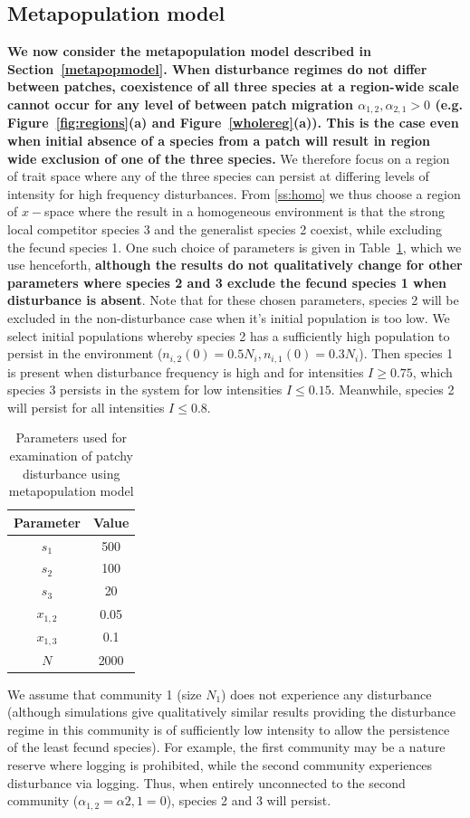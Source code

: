 \subsection{Metapopulation model}
\textbf{We now consider the metapopulation model described in Section~\ref{metapopmodel}. When disturbance regimes do not differ between patches, coexistence of all three species at a region-wide scale cannot occur for any level of between patch migration $\alpha_{1,2},\alpha_{2,1}>0$ (e.g. Figure~\ref{fig:regions}(a) and Figure~\ref{wholereg}(a)). This is the case even when initial absence of a species from a patch will result in region wide exclusion of one of the three species.} We therefore focus on a region of trait space where any of the three species can persist at differing levels of intensity for high frequency disturbances. From \ref{ss:homo} we thus choose a region of $x-$space where the result in a homogeneous environment is that the strong local competitor species 3 and the generalist species 2 coexist, while excluding the fecund species 1. One such choice of parameters is given in Table~\ref{tab:paras}, which we use henceforth, \textbf{although the results do not qualitatively change for other parameters where species 2 and 3 exclude the fecund species 1 when disturbance is absent}. Note that for these chosen parameters, species 2 will be excluded in the non-disturbance case when it's initial population is too low. We select initial populations whereby species 2 has a sufficiently high population to persist in the environment ($n_{i,2}(0)=0.5N_i,n_{i,1}(0)=0.3N_i$). Then species 1 is present when disturbance frequency is high and for intensities $I\geq0.75$, which species 3 persists in the system for low intensities $I\leq 0.15$. Meanwhile, species 2 will persist for all intensities $I\leq 0.8$.
\begin{table}[htdp]
\begin{center}
\begin{tabular}{|c|c|} \hline
Parameter & Value\\ \hline
$s_1$&500\\
$s_2$&100\\
$s_3$&20\\
$x_{1,2}$&0.05\\
$x_{1,3}$&0.1\\
$N$&2000\\ \hline
\end{tabular}
\end{center}
\caption[Parameters used for examination of patchy disturbance]{Parameters used for examination of patchy disturbance using metapopulation model}
\label{tab:paras}
\end{table}
We assume that community 1 (size $N_1$) does not experience any disturbance (although simulations give qualitatively similar results providing the disturbance regime in this community is of sufficiently low intensity to allow the persistence of the least fecund species). For example, the first community may be a nature reserve where logging is prohibited, while the second community experiences disturbance via logging. Thus, when entirely unconnected to the second community ($\alpha_{1,2}=\alpha{2,1}=0$), species 2 and 3 will persist.

